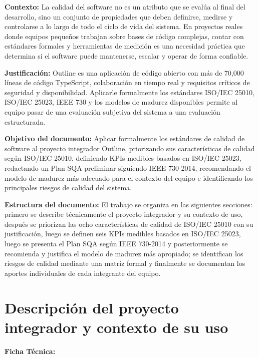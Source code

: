 \documentclass{report}
\begin{document}
\textbf{Contexto:} La calidad del software no es un atributo que se evalúa al final del desarrollo, sino un conjunto de propiedades que deben definirse, medirse y controlarse a lo largo de todo el ciclo de vida del sistema. En proyectos reales donde equipos pequeños trabajan sobre bases de código complejas, contar con estándares formales y herramientas de medición es una necesidad práctica que determina si el software puede mantenerse, escalar y operar de forma confiable.

\textbf{Justificación:} Outline es una aplicación de código abierto con más de 70,000 líneas de código TypeScript, colaboración en tiempo real y requisitos críticos de seguridad y disponibilidad. Aplicarle formalmente los estándares ISO/IEC 25010, ISO/IEC 25023, IEEE 730 y los modelos de madurez disponibles permite al equipo pasar de una evaluación subjetiva del sistema a una evaluación estructurada.

\textbf{Objetivo del documento:} Aplicar formalmente los estándares de calidad de software al proyecto integrador Outline, priorizando sus características de calidad según ISO/IEC 25010, definiendo KPIs medibles basados en ISO/IEC 25023, redactando un Plan SQA preliminar siguiendo IEEE 730-2014, recomendando el modelo de madurez más adecuado para el contexto del equipo e identificando los principales riesgos de calidad del sistema.

\textbf{Estructura del documento:} El trabajo se organiza en las siguientes secciones: primero se describe técnicamente el proyecto integrador y su contexto de uso, después se priorizan las ocho características de calidad de ISO/IEC 25010 con su justificación, luego se definen seis KPIs medibles basados en ISO/IEC 25023, luego se presenta el Plan SQA según IEEE 730-2014 y posteriormente se recomienda y justifica el modelo de madurez más apropiado; se identifican los riesgos de calidad mediante una matriz formal y finalmente se documentan los aportes individuales de cada integrante del equipo.

\newpage
\chapter*{Descripción del proyecto integrador y contexto de su uso}

\textbf{Ficha Técnica: }
\end{document}

